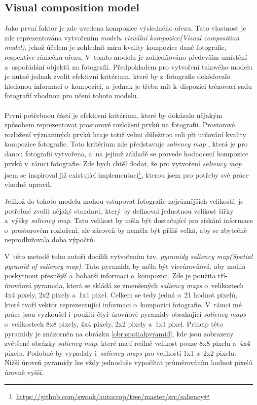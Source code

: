 \subsection{Visual composition model}
Jako první faktor je zde uvedena kompozice výsledného ořezu. Tato vlastnost je zde reprezentována vytvořením \emph{modelu vizuální kompozice(Visual composition model)}, jehož účelem je zohlednit míru kvality kompozice dané fotografie, respektive rámečku ořezu. V~tomto modelu je zohledňováno především umístění a~uspořádání objektů na fotografii. Předpokladem pro vytvoření takového modelu je nutné jednak zvolit efektivní kritérium, které by z~fotografie dekódovalo hledanou informaci o~kompozici, a~jednak je třeba mít k~dispozici trénovací sadu fotografií vhodnou pro učení tohoto modelu.

\paragraph{}
První potřebnou částí je efektivní kritérium, které by dokázalo nějakým způsobem reprezentovat prostorové rozložení prvků na fotografii. Prostorové rozložení významných prvků hraje totiž velmi důležitou roli při určování kvality kompozice fotografie. Toto kritérium zde představuje \emph{saliency map} \cite{Margolin2013}, která je pro danou fotografii vytvořena, a~na jejímž základě se provede hodnocení kompozice prvků v~rámci fotografie. Zde bych chtěl dodat, že pro vytvoření \emph{saliency map} jsem se inspiroval již existující implementací\footnote{\url{https://github.com/swook/autocrop/tree/master/src/saliency}}, kterou jsem pro potřeby své práce vhodně upravil.

Jelikož do tohoto modelu mohou vstupovat fotografie nejrůznějších velikostí, je potřebné zvolit nějaký standard, který by definoval jednotnou velikost šířky a~výšky \emph{saliency map}. Tato velikost by měla být dostačující pro získání informace o~prostorovém rozložení, ale zároveň by neměla být příliš velká, aby se zbytečně neprodlužovala doba výpočtů.

V~této metodě toho autoři docílili vytvořením tzv. \emph{pyramidy saliency map(Spatial pyramid of saliency map)}. Tato pyramida by měla být víceúrovňová, aby mohla poskytnout přesnější a~bohatší informaci o~kompozici. Zde je použita tří-úrovňová pyramida, která se skládá ze zmenšených \emph{saliency maps} o~velikostech 4x4 pixely, 2x2 pixely a~1x1 pixel. Celkem se tedy jedná o~21 hodnot pixelů, které tvoří vektor reprezentující informaci o~kompozici fotografie. V~rámci mé práce jsou vyzkoušel i~použití čtyř-úrovňové pyramidy obsahující \emph{saliency maps} o~velikostech 8x8 pixely, 4x4 pixely, 2x2 pixely a~1x1 pixel. Princip této pyramidy je znázorněn na obrázku \ref{obr:spatialpyramid}, kde jsou zobrazeny zvětšené obrázky \emph{saliency map}, které mají reálně velikost pouze 8x8 pixelu a~4x4 pixelu. Podobně by vypadaly i~\emph{saliency maps} pro velikosti 1x1 a~2x2 pixelu. Nižší úroveň pyramidy lze vždy jednoduše vypočítat průměrováním hodnot pixelů úrovně vyšší.

